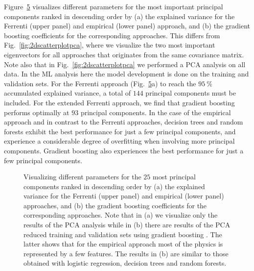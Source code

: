 \documentclass[superscriptaddress,unsortedaddress,
 amsmath,amssymb,
 aps,
]{revtex4-2}
\begin{document}
Figure~\ref{fig:PComponents} visualizes different parameters for the most important principal components ranked in descending order by (a) the explained variance for the Ferrenti (upper panel) and empirical (lower panel) approach, and (b) the gradient boosting coefficients for the corresponding approaches. This differs from Fig.~\ref{fig:2dscatterplotpca}, where we visualize the two most important eigenvectors for all approaches that originates from the same covariance matrix. Note also that in  Fig.~\ref{fig:2dscatterplotpca} we performed a PCA analysis on all data. In the ML analysis here the model development is done on the training and validation sets. For the Ferrenti approach (Fig.~\ref{fig:PComponents}a) to reach the $95 \ \%$ accumulated explained variance, a total of $144$ principal components must be included. For the extended Ferrenti approach, we find that gradient boosting performs optimally at $93$ principal components. 
%
In the case of the empirical approach and in contrast to the Ferrenti approaches, decision trees and random forests exhibit the best performance for just a few principal components, and experience a considerable degree of overfitting when involving more principal components. Gradient boosting 
also experiences the best performance for just a few principal components. 

\begin{figure}[t]
    \centering
    \begin{subfigure}[b]{0.45\textwidth}
        
        \label{fig:01-fi-e}
    \end{subfigure}
    \begin{subfigure}[b]{0.45\textwidth}
        
        \label{fig:01-fi-d}
    \end{subfigure}%
    \hfill
    \begin{subfigure}[b]{0.45\textwidth}
        
        \label{fig:03-fi-e}
        \subcaption{}
    \end{subfigure}
    \begin{subfigure}[b]{0.45\textwidth}
        
        \label{fig:03-fi-d}
        \subcaption{}
    \end{subfigure}
    \caption{Visualizing different parameters for the $25$ most principal components ranked in descending order by (a) the explained variance for the Ferrenti (upper panel) and empirical (lower panel) approaches, and (b) the gradient boosting coefficients for the corresponding approaches. Note that in (a) we visualize only the results of the PCA analysis while in (b) there are results of the PCA reduced training and validation sets using gradient boosting \cite{Hastie2009,xgboost2016}. The latter shows that for the empirical approach most of the physics is represented by a few features. The results in (b) are similar to those obtained with logistic regression, decision trees and random forests.  
    }
    \label{fig:PComponents}
\end{figure}
\end{document}
